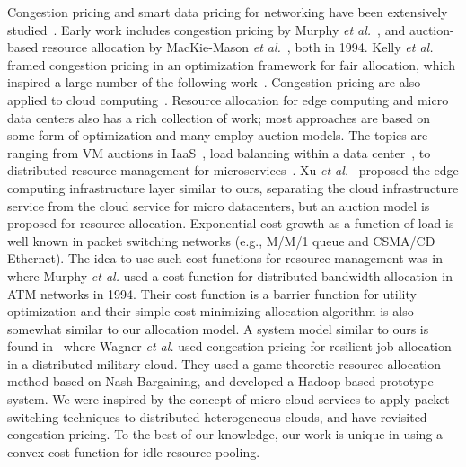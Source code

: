 Congestion pricing and smart data pricing for networking have been
extensively studied~\cite{Sen-2013}.
Early work includes congestion pricing by
Murphy {\em et al.}~\cite{MURPHY19941053},
and auction-based resource allocation by
MacKie-Mason {\em et al.}~\cite{pricing-internet-1994}, both in 1994.
Kelly {\em et al.}~\cite{Kelly-1998} framed congestion pricing in an
optimization framework for fair allocation, which inspired a large
number of the following
work~\cite{Sen-2013,gibbens1999resource,Henderson2001,Briscoe2003-M3I}.
Congestion pricing are also applied to cloud
computing~\cite{Wang-hotcloud2010,Song-2014,Kilcioglu-SIGMETRICS2015,Song-INFOCOM2017}.
Resource allocation for edge computing and micro data centers also has
a rich collection of work; most approaches are based on some form of
optimization and many employ auction models.
The topics are ranging from VM auctions in
IaaS~\cite{Zhang2017-VMauction,Zaman-2013},
load balancing within a data center~\cite{Rikhtegar2021BiTEAD,Chen-SOCC-2014},
to
distributed resource management for microservices~\cite{Suresh-SOA-SOCC2017}.
Xu {\em et al.}~\cite{Xu2017-zenith} proposed the edge computing
infrastructure layer similar to ours, separating the cloud
infrastructure service from the cloud service for micro datacenters,
but an auction model is proposed for resource allocation.
Exponential cost growth as a function of load is well known in packet
switching networks (e.g., M/M/1 queue and CSMA/CD Ethernet).
The idea to use such cost functions for resource management
was in \cite{MURPHY19941053} where
Murphy {\em et al.} used a cost function for distributed bandwidth
allocation in ATM networks in 1994.
Their cost function is a barrier function for utility optimization
and their simple cost minimizing allocation algorithm is also somewhat
similar to our allocation model.
A system model similar to ours is found in~\cite{Wagner-2012} where
Wagner {\em et al.} used congestion pricing for resilient job
allocation in a distributed military cloud.  They used a
game-theoretic resource allocation method based on Nash Bargaining,
and developed a Hadoop-based prototype system.
We were inspired by the concept of micro cloud services to apply packet
switching techniques to distributed heterogeneous clouds, and have
revisited congestion pricing.
To the best of our knowledge, our work is unique in using a convex
cost function for idle-resource pooling.



